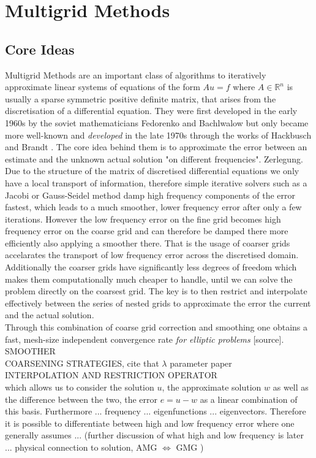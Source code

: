 \documentclass[../draft_1.tex]{subfiles}
\begin{document}
\chapter{Multigrid Methods}

\section{Core Ideas}
Multigrid Methods are an important class of algorithms to iteratively approximate linear systems of equations of the form $Au = f$ where $A \in \mathbb{R}^n$ is usually a sparse symmetric positive definite matrix, that arises from the discretisation of a differential equation. They were first developed in the early 1960s by the soviet mathematicians Fedorenko and Bachlwalow but only became more well-known and \textit{developed} in the late 1970s through the works of Hackbusch \cite{hackbusch2013multi} and Brandt \cite{brandt1977multi}. The core idea behind them is to approximate the error between an estimate and the unknown actual solution "on different frequencies". Zerlegung. Due to the structure of the matrix of discretised differential equations we only have a local transport of information, therefore simple iterative solvers such as a Jacobi or Gauss-Seidel method damp high frequency components of the error fastest, which leads to a much smoother, lower frequency error after only a few iterations. However the low frequency error on the fine grid becomes high frequency error on the coarse grid and can therefore be damped there more efficiently also applying a smoother there. That is the usage of coarser grids accelarates the transport of low frequency error across the discretised domain. Additionally the coarser grids have significantly less degrees of freedom which makes them computationally much cheaper to handle, until we can solve the problem directly on the coarsest grid. The key is to then restrict and interpolate effectively between the series of nested grids to approximate the error the current and the actual solution. 
\smallskip
\\
Through this combination of coarse grid correction and smoothing one obtains a fast, mesh-size independent convergence rate \textit{for elliptic problems} [source].
\smallskip
\\
SMOOTHER
\smallskip
\\
COARSENING STRATEGIES, cite that $\lambda$ parameter paper
\smallskip
\\
INTERPOLATION AND RESTRICTION OPERATOR
\smallskip
\\
which allows us to consider the solution $u$, the approximate solution $w$ as well as the difference between the two, the error $ e = u - w$ as a linear combination of this basis. Furthermore ... frequency ... eigenfunctions ... eigenvectors. Therefore it is possible to differentiate between high and low frequency error where one generally assumes ... (further discussion of what high and low frequency is later ... physical connection to solution, AMG $ \iff $ GMG )
\end{document}
